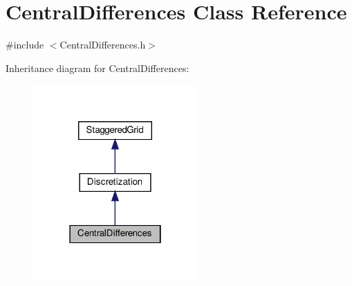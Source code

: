 \hypertarget{classCentralDifferences}{}\section{Central\+Differences Class Reference}
\label{classCentralDifferences}


{\ttfamily \#include $<$Central\+Differences.\+h$>$}



Inheritance diagram for Central\+Differences\+:
\nopagebreak
\begin{figure}[H]
\begin{center}
\leavevmode
\includegraphics[width=178pt]{classCentralDifferences__inherit__graph}
\end{center}
\end{figure}



